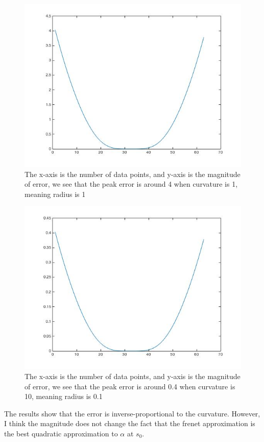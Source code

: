 \documentclass[twoside]{article}
\theoremstyle{definition}
\theoremstyle{definition}
\theoremstyle{remark}
\begin{document}
\begin{figure}[H]
\centering
\includegraphics[width=120mm]{1.jpg}
\caption{The x-axis is the number of data points, and y-axis is the magnitude of error, we see that the peak error is around 4 when curvature is 1, meaning radius is 1}
\end{figure}

\begin{figure}[H]
\centering
\includegraphics[width=120mm]{10.jpg}
\caption{The x-axis is the number of data points, and y-axis is the magnitude of error, we see that the peak error is around 0.4 when curvature is 10, meaning radius is 0.1}
\end{figure}

The results show that the error is inverse-proportional to the curvature. However, I think the magnitude does not change the fact that the frenet approximation is the best quadratic approximation to $\alpha$ at $s_0$.
\end{document}
